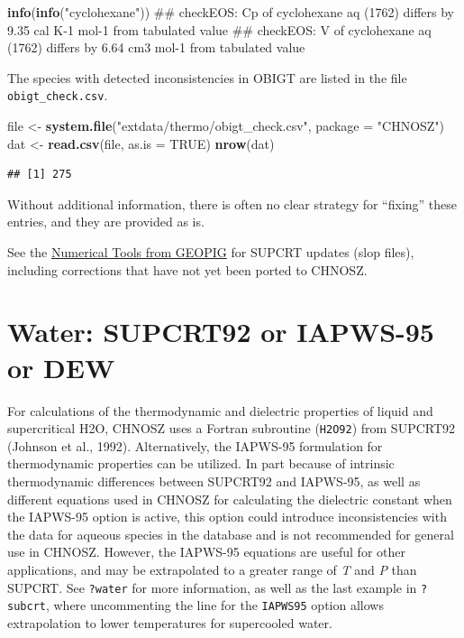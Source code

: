 \documentclass[]{tufte-book}
\newenvironment{Shaded}{}{}
\newcommand{\KeywordTok}[1]{\textcolor[rgb]{0.00,0.44,0.13}{\textbf{#1}}}
\newcommand{\DataTypeTok}[1]{\textcolor[rgb]{0.56,0.13,0.00}{#1}}
\newcommand{\StringTok}[1]{\textcolor[rgb]{0.25,0.44,0.63}{#1}}
\newcommand{\OtherTok}[1]{\textcolor[rgb]{0.00,0.44,0.13}{#1}}
\newcommand{\NormalTok}[1]{#1}
\begin{document}
\begin{Shaded}
\begin{Highlighting}[]
\KeywordTok{info}\NormalTok{(}\KeywordTok{info}\NormalTok{(}\StringTok{"cyclohexane"}\NormalTok{))}
\NormalTok{## checkEOS: Cp of cyclohexane aq (1762) differs by 9.35 cal K-1 mol-1 from tabulated value}
\NormalTok{## checkEOS: V of cyclohexane aq (1762) differs by 6.64 cm3 mol-1 from tabulated value}
\end{Highlighting}
\end{Shaded}

The species with detected inconsistencies in OBIGT are listed in the
file \texttt{obigt\_check.csv}.

\begin{Shaded}
\begin{Highlighting}[]
\NormalTok{file <-}\StringTok{ }\KeywordTok{system.file}\NormalTok{(}\StringTok{"extdata/thermo/obigt_check.csv"}\NormalTok{, }\DataTypeTok{package =} \StringTok{"CHNOSZ"}\NormalTok{)}
\NormalTok{dat <-}\StringTok{ }\KeywordTok{read.csv}\NormalTok{(file, }\DataTypeTok{as.is =} \OtherTok{TRUE}\NormalTok{)}
\KeywordTok{nrow}\NormalTok{(dat)}
\end{Highlighting}
\end{Shaded}

\begin{verbatim}
## [1] 275
\end{verbatim}

Without additional information, there is often no clear strategy for
``fixing'' these entries, and they are provided as is.

\begin{marginfigure}
See the \href{http://geopig.asu.edu/?q=tools}{Numerical Tools from
GEOPIG} for SUPCRT updates (slop files), including corrections that have
not yet been ported to CHNOSZ.
\end{marginfigure}

\section{Water: SUPCRT92 or IAPWS-95 or
DEW}\label{water-supcrt92-or-iapws-95-or-dew}

For calculations of the thermodynamic and dielectric properties of
liquid and supercritical H2O, CHNOSZ uses a Fortran subroutine
(\texttt{H2O92}) from SUPCRT92 (Johnson et al., 1992). Alternatively,
the IAPWS-95 formulation for thermodynamic properties \citep{WP02} can
be utilized. In part because of intrinsic thermodynamic differences
between SUPCRT92 and IAPWS-95, as well as different equations used in
CHNOSZ for calculating the dielectric constant when the IAPWS-95 option
is active, this option could introduce inconsistencies with the data for
aqueous species in the database and is not recommended for general use
in CHNOSZ. However, the IAPWS-95 equations are useful for other
applications, and may be extrapolated to a greater range of \emph{T} and
\emph{P} than SUPCRT. See {\texttt{?water}} for more information, as
well as the last example in {\texttt{?subcrt}}, where uncommenting the
line for the \texttt{IAPWS95} option allows extrapolation to lower
temperatures for supercooled water.
\end{document}
